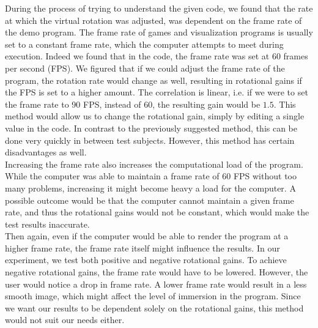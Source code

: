 During the process of trying to understand the given code, we found that the rate at which the virtual rotation was adjusted, was dependent on the frame rate of the demo program.
The frame rate of games and visualization programs is usually set to a constant frame rate, which the computer attempts to meet during execution.
Indeed we found that in the code, the frame rate was set at 60 frames per second (FPS).
We figured that if we could adjust the frame rate of the program, the rotation rate would change as well, resulting in rotational gains if the FPS is set to a higher amount.
The correlation is linear, i.e. if we were to set the frame rate to 90 FPS, instead of 60, the resulting gain would be $1.5$.
This method would allow us to change the rotational gain, simply by editing a single value in the code.
In contrast to the previously suggested method, this can be done very quickly in between test subjects.
However, this method has certain disadvantages as well. \\
Increasing the frame rate also increases the computational load of the program.
While the computer was able to maintain a frame rate of 60 FPS without too many problems, increasing it might become heavy a load for the computer.
A possible outcome would be that the computer cannot maintain a given frame rate, and thus the rotational gains would not be constant, which would make the test results inaccurate. \\
Then again, even if the computer would be able to render the program at a higher frame rate, the frame rate itself might influence the results.
In our experiment, we test both positive and negative rotational gains.
To achieve negative rotational gains, the frame rate would have to be lowered.
However, the user would notice a drop in frame rate.
A lower frame rate would result in a less smooth image, which might affect the level of immersion in the program.
Since we want our results to be dependent solely on the rotational gains, this method would not suit our needs either. \\


